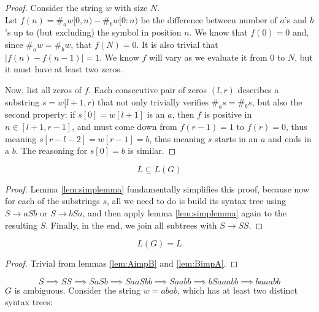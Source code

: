 \documentclass[docid=TP08]{tcom_TP}
\begin{document}
{\begin{lemma}
\end{lemma}
\begin{proof}
Consider the string $w$ with size $N$.\\
Let $f(n)=\#_aw[0,n)-\#_bw[0:n)$ be the difference between number of $a$'s and $b$'s up to (but excluding) the symbol in position $n$. We know that $f(0)=0$ and, since $\#_aw=\#_bw$, that $f(N)=0$. It is also trivial that $|f(n)-f(n-1)| = 1$. We know $f$ will vary as we evaluate it from $0$ to $N$, but it must have at least two zeros.\par
Now, list all zeros of $f$. Each consecutive pair of zeros $(l,r)$ describes a substring $s=w[l+1,r)$ that not only trivially verifies $\#_as=\#_bs$, but also the second property: if $s[0] = w[l+1]$ is an $a$, then $f$ is positive in $n \in [l+1,r-1]$, and must come down from $f(r-1)=1$ to $f(r)=0$, thus meaning $s[r-l-2]=w[r-1]=b$, thus meaning $s$ starts in an $a$ and ends in a $b$. The reasoning for $s[0]=b$ is similar.
\end{proof}
\begin{lemma} \label{lem:BimpA}
\begin{equation*}
	L \subseteq L(G)
\end{equation*}
\end{lemma}
\begin{proof}
Lemma \ref{lem:simplemma} fundamentally simplifies this proof, because now for each of the substrings $s$, all we need to do is build its syntax tree using $S \rightarrow aSb$ or $S \rightarrow bSa$, and then apply lemma \ref{lem:simplemma} again to the resulting $S$. Finally, in the end, we join all subtrees with $S \rightarrow SS$. 
\end{proof}
\begin{theorem}
\begin{equation*}
	L(G) = L
\end{equation*}
\end{theorem}
\begin{proof}
Trivial from lemmas \ref{lem:AimpB} and \ref{lem:BimpA}.
\end{proof}
\begin{equation*}
	S \implies SS \implies SaSb \implies SaaSbb \implies Saabb \implies bSaaabb \implies baaabb
\end{equation*}
$G$ is ambiguous. Consider the string $w=abab$, which has at least two distinct syntax trees:\\
\begin{minipage}[t]{0.49\textwidth}

\end{minipage}}
\end{document}
